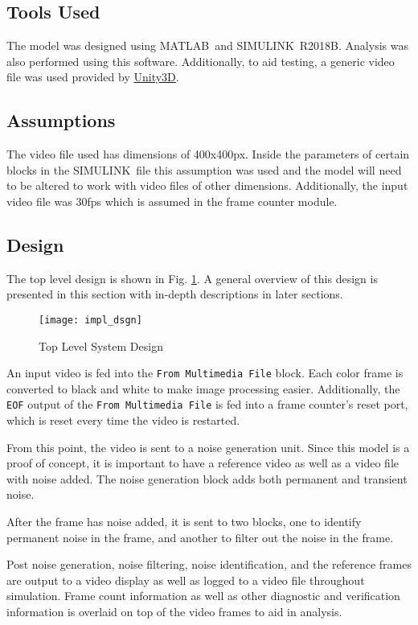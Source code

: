 \subsection{Tools Used}
The model was designed using MATLAB\textregisteredmark\ and SIMULINK\textregisteredmark\ R2018B. Analysis was also performed using this software. Additionally, to aid testing, a generic video file was used provided by \hyperlink{https://blogs.unity3d.com/2016/11/28/free-vfx-image-sequences-flipbooks/}{Unity3D}.
\subsection{Assumptions}
The video file used has dimensions of 400x400px. Inside the parameters of certain blocks in the SIMULINK\textregisteredmark\ file this assumption was used and the model will need to be altered to work with video files of other dimensions. Additionally, the input video file was 30fps which is assumed in the frame counter module.
\subsection{Design}
The top level design is shown in Fig. \ref{fig:sysSpecs}. A general overview of this design is presented in this section with in-depth descriptions in later sections.
\begin{figure}[H]
    \texttt{[image: impl\_dsgn]}
    \caption{Top Level System Design}
    \label{fig:sysSpecs}
\end{figure}
\par An input video is fed into the \verb!From Multimedia File! block. Each color frame is converted to black and white to make image processing easier. Additionally, the \verb!EOF! output of the \verb!From Multimedia File! is fed into a frame counter's reset port, which is reset every time the video is restarted.
\par From this point, the video is sent to a noise generation unit. Since this model is a proof of concept, it is important to have a reference video as well as a video file with noise added. The noise generation block adds both permanent and transient noise.
\par After the frame has noise added, it is sent to two blocks, one to identify permanent noise in the frame, and another to filter out the noise in the frame.
\par Post noise generation, noise filtering, noise identification, and the reference frames are output to a video display as well as logged to a video file throughout simulation. Frame count information as well as other diagnostic and verification information is overlaid on top of the video frames to aid in analysis.
